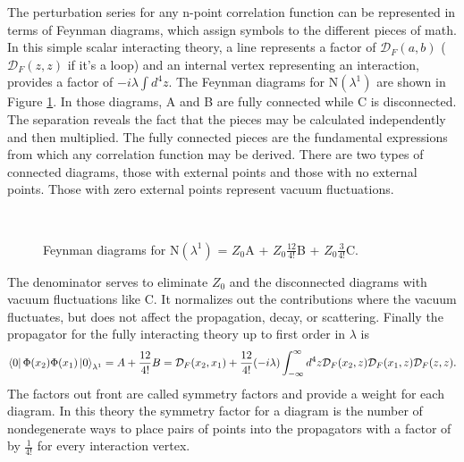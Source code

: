 The perturbation series for any n-point correlation function can be represented in terms of Feynman diagrams, which assign symbols to the different pieces of math. In this simple scalar interacting theory, a line represents a factor of $\mathcal{D}_F(a,b)$ ($\mathcal{D}_F(z,z)$ if it's a loop) and an internal vertex representing an interaction, provides a factor of $-i\lambda\int d^4z$. The Feynman diagrams for N$(\lambda^1)$ are shown in Figure \ref{fig:feynfullprop}. In those diagrams, A and B are fully connected while C is disconnected. The separation reveals the fact that the pieces may be calculated independently and then multiplied. The fully connected pieces are the fundamental expressions from which any correlation function may be derived. There are two types of connected diagrams, those with external points and those with no external points. Those with zero external points represent vacuum fluctuations.
\begin{figure}[htbp]
     \centering
   \mbox{
       \qquad
       \qquad
       \qquad
     }
    \caption[Feynman diagrams for the Numerator N$(\lambda^1)$ = $Z_0$A + $Z_0$B + $Z_0$C.]
    {Feynman diagrams for N$(\lambda^1)$ = $Z_0$A + $Z_0\frac{12}{4!}$B + $Z_0\frac{3}{4!}$C.}
    \label{fig:feynfullprop}
\end{figure}
The denominator serves to eliminate $Z_0$ and the disconnected diagrams with vacuum fluctuations like C. It normalizes out the contributions where the vacuum fluctuates, but does not affect the propagation, decay, or scattering. Finally the propagator for the fully interacting theory up to first order in $\lambda$ is 
\begin{equation}
\bra{0}\Phi(x_2)\Phi(x_1)\ket{0}_{\lambda^1} = A + \frac{12}{4!}B = \mathcal{D}_F(x_2,x_1) + 
\frac{12}{4!}(-i\lambda)\int_{-\infty}^{\infty} d^4z \mathcal{D}_F(x_2,z) \mathcal{D}_F(x_1,z) \mathcal{D}_F(z,z).
\end{equation}
The factors out front are called symmetry factors and provide a weight for each diagram. In this theory the symmetry factor for a diagram is the number of nondegenerate ways to place pairs of points into the propagators with a factor of by $\frac{1}{4!}$ for every interaction vertex. 

